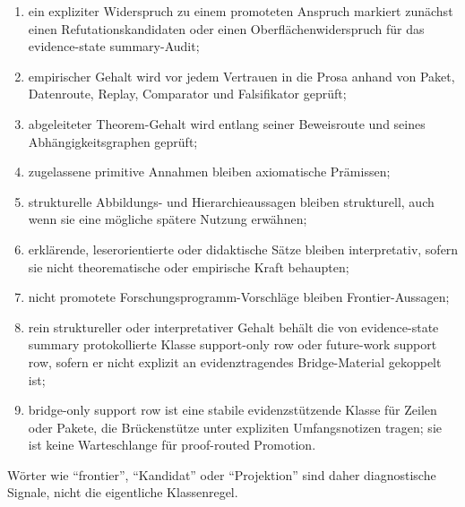 \begin{enumerate}
\item ein expliziter Widerspruch zu einem promoteten Anspruch markiert
      zunächst einen Refutationskandidaten oder einen Oberflächenwiderspruch
      für das evidence-state summary-Audit;
\item empirischer Gehalt wird vor jedem Vertrauen in die Prosa anhand von
      Paket, Datenroute, Replay, Comparator und Falsifikator geprüft;
\item abgeleiteter Theorem-Gehalt wird entlang seiner Beweisroute und seines
      Abhängigkeitsgraphen geprüft;
\item zugelassene primitive Annahmen bleiben axiomatische Prämissen;
\item strukturelle Abbildungs- und Hierarchieaussagen bleiben strukturell,
      auch wenn sie eine mögliche spätere Nutzung erwähnen;
\item erklärende, leserorientierte oder didaktische Sätze bleiben interpretativ,
      sofern sie nicht theorematische oder empirische Kraft behaupten;
\item nicht promotete Forschungsprogramm-Vorschläge bleiben Frontier-Aussagen;
\item rein struktureller oder interpretativer Gehalt behält die von evidence-state summary
      protokollierte Klasse support-only row oder future-work support row,
      sofern er nicht explizit an evidenztragendes Bridge-Material gekoppelt ist;
\item bridge-only support row ist eine stabile evidenzstützende Klasse für Zeilen
      oder Pakete, die Brückenstütze unter expliziten Umfangsnotizen tragen;
      sie ist keine Warteschlange für proof-routed Promotion.
\end{enumerate}
Wörter wie ``frontier'', ``Kandidat'' oder ``Projektion'' sind daher
diagnostische Signale, nicht die eigentliche Klassenregel.

